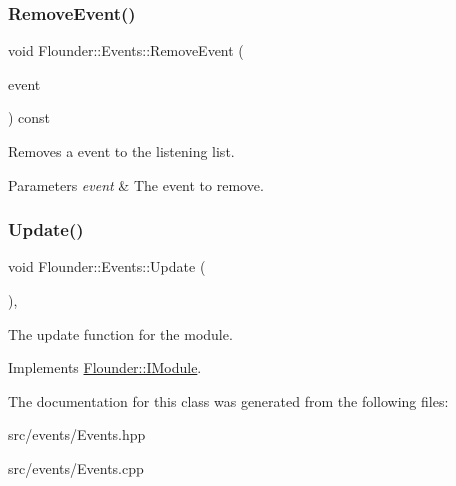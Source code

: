\subsubsection{\texorpdfstring{Remove\+Event()}{RemoveEvent()}}
{\footnotesize\ttfamily void Flounder\+::\+Events\+::\+Remove\+Event (\begin{DoxyParamCaption}\item[{\hyperlink{class_flounder_1_1_i_event}{I\+Event} $\ast$}]{event }\end{DoxyParamCaption}) const}



Removes a event to the listening list. 


\begin{DoxyParams}{Parameters}
{\em event} & The event to remove. \\
\hline
\end{DoxyParams}
\mbox{\label{class_flounder_1_1_events_a21906c6e0d40382ced06012612fd61f5}} 
\subsubsection{\texorpdfstring{Update()}{Update()}}
{\footnotesize\ttfamily void Flounder\+::\+Events\+::\+Update (\begin{DoxyParamCaption}{ }\end{DoxyParamCaption})\hspace{0.3cm}{\ttfamily [override]}, {\ttfamily [virtual]}}



The update function for the module. 



Implements \hyperlink{class_flounder_1_1_i_module_a1812bb03a6990e4698a10c043fa25fde}{Flounder\+::\+I\+Module}.



The documentation for this class was generated from the following files\+:\begin{DoxyCompactItemize}
\item 
src/events/Events.\+hpp\item 
src/events/Events.\+cpp\end{DoxyCompactItemize}
